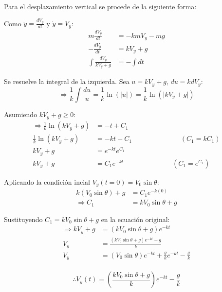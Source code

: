 Para el desplazamiento vertical se procede de la siguiente forma:
\vspace{5 mm}

Como $\ddot{y}=\frac{dV_{y}}{dt}$ y $\dot{y}=V_{y}$:
\begin{align*}
    m\frac{dV_{y}}{dt} &= -kmV_{y}-mg\\
    -\frac{dV_{y}}{dt} &= kV_{y}+g\\
    \int \frac{dV_{y}}{kV_{y}+g} &= -\int dt
\end{align*}

\vspace{5 mm}
Se resuelve la integral de la izquierda. Sea $u=kV_{y}+g$, $du=kdV_{y}$:
\begin{equation*}
    \Rightarrow \frac{1}{k} \int \frac{du}{u} = \frac{1}{k} \ln(\lvert u \rvert) = \frac{1}{k} \ln(\lvert kV_{y}+g \rvert)
\end{equation*}

\vspace{5 mm}
Asumiendo $kV_{y}+g \geq 0$:
\begin{align*}
    \Rightarrow \frac{1}{k} \ln(kV_{y}+g) &= -t+C_{1}\\
    \frac{1}{k} \ln(kV_{y}+g) &= -kt+C_{1} \hspace{3cm} (C_{1}=kC_{1})\\
    kV_{y}+g &= e^{-kt}e^{C_{1}}\\
    kV_{y}+g &= C_{1}e^{-kt} \hspace{3cm} (C_{1}=e^{C_{1}})
\end{align*}

\vspace{5 mm}
Aplicando la condición incial $V_{y}(t=0)=V_{0}\sin\theta$:
\begin{align*}
    k(V_{0}\sin\theta)+g &= C_{1}e^{-k(0)}\\
    \Rightarrow C_{1} &= kV_{0}\sin\theta+g
\end{align*}

\vspace{5 mm}
Sustituyendo $C_{1} = kV_{0}\sin\theta+g$ en la ecuación original:
\begin{align*}
    \Rightarrow kV_{y}+g &= (kV_{0}\sin\theta+g)e^{-kt}\\
    V_{y} &= \frac{(kV_{0}\sin\theta+g)e^{-kt}-g}{k}\\
    V_{y} &= (V_{0}\sin\theta)e^{-kt} + \frac{g}{k}e^{-kt} - \frac{g}{k}\\
\end{align*}

\begin{equation*}
    \therefore V_{y}(t) = \left (\frac{kV_{0}\sin\theta+g}{k} \right)e^{-kt} - \frac{g}{k}
\end{equation*}